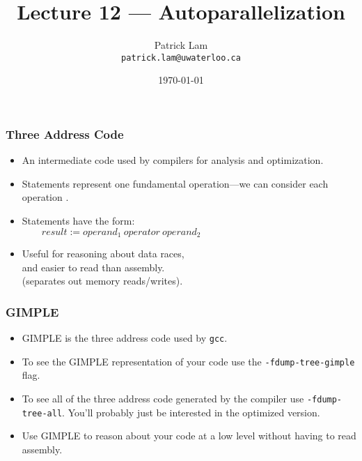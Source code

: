 

\title{Lecture 12 --- Autoparallelization }

\author{Patrick Lam \\ \small \texttt{patrick.lam@uwaterloo.ca}}
\date{\today}




\begin{frame}
  \titlepage

 \end{frame}
 
\begin{frame}
  \frametitle{Three Address Code}

  
  \begin{itemize}
    \item An intermediate code used by compilers
      for analysis and optimization.
    \vfill
    \item Statements represent one fundamental operation---we
      can consider each operation .
    \vfill
    \item Statements have the form:\\
      $\qquad result := operand_1\:operator\:operand_2$
    \vfill
    \item Useful for reasoning about data races,\\ and easier to read than assembly. \\
            \hspace*{1cm} (separates out memory reads/writes).
  \end{itemize}
  
\end{frame}

\begin{frame}
  \frametitle{GIMPLE}

  
  \begin{itemize}
    \item GIMPLE is the three address code used by {\tt gcc}.
    \vfill
    \item To see the GIMPLE representation of your code use the
      {\tt -fdump-tree-gimple} flag.
    \vfill
    \item To see all of the three address code generated by the compiler use
      {\tt -fdump-tree-all}. You'll probably just be interested in the
      optimized version.
    \vfill
    \item Use GIMPLE to reason about your code at a low level without
      having to read assembly.
  \end{itemize}
  
\end{frame}


